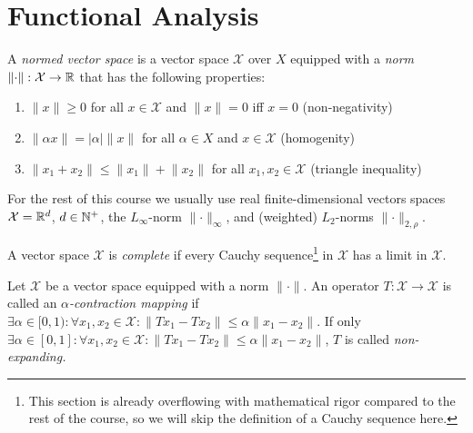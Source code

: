 	\section{Functional Analysis}
		\begin{definition}
			A \emph{normed vector space} is a vector space \(\mathcal{X}\) over \(X\) equipped with a \emph{norm} \( \lVert \cdot \rVert : \mathcal{X} \to \mathbb{R} \) that has the following properties:
			\begin{enumerate}
				\item \( \lVert x \rVert \geq 0 \) for all \( x \in \mathcal{X} \) and \( \lVert x \rVert = 0 \) iff \( x = 0 \) (non-negativity)
				\item \( \lVert \alpha x \rVert = \lvert \alpha \rvert \lVert x \rVert \) for all \( \alpha \in X \) and \( x \in \mathcal{X} \) (homogenity)
				\item \( \lVert x_1 + x_2 \rVert \leq \lVert x_1 \rVert + \lVert x_2 \rVert \) for all \( x_1, x_2 \in \mathcal{X} \) (triangle inequality)
			\end{enumerate}
		\end{definition}
		For the rest of this course we usually use real finite-dimensional vectors spaces \( \mathcal{X} = \mathbb{R}^d \), \( d \in \mathbb{N}^+ \), the \(L_\infty\)-norm \( \lVert \cdot \rVert_\infty \), and (weighted) \(L_2\)-norms \( \lVert \cdot \rVert_{2, \rho} \).

		\begin{definition}
			A vector space \(\mathcal{X}\) is \emph{complete} if every Cauchy sequence\footnote{This section is already overflowing with mathematical rigor compared to the rest of the course, so we will skip the definition of a Cauchy sequence here.} in \(\mathcal{X}\) has a limit in \(\mathcal{X}\).
		\end{definition}

		\begin{definition}
			Let \(\mathcal{X}\) be a vector space equipped with a norm \(\lVert \cdot \rVert\). An operator \( T : \mathcal{X} \to \mathcal{X} \) is called an \emph{\(\alpha\)-contraction mapping} if \( \exists \alpha \in [0, 1) : \forall x_1, x_2 \in \mathcal{X} : \lVert T x_1 - T x_2 \rVert \leq \alpha \lVert x_1 - x_2 \rVert \). If only \( \exists \alpha \in [0, 1] : \forall x_1, x_2 \in \mathcal{X} : \lVert T x_1 - T x_2 \rVert \leq \alpha \lVert x_1 - x_2 \rVert \), \(T\) is called \emph{non-expanding.}
		\end{definition}

